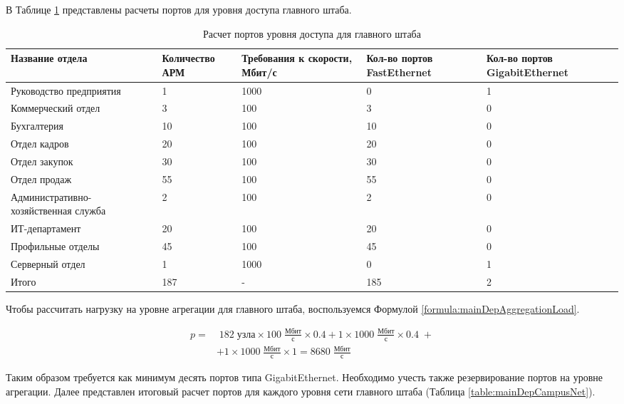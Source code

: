 \documentclass[14pt, a4paper]{extarticle}
\numberwithin{equation}{section}
\begin{document}
В Таблице \ref{table:mainDepAccessLevel} представлены расчеты портов для уровня доступа 
главного штаба.

\begin{table}[H]
\centering
\small
\caption{Расчет портов уровня доступа для главного штаба}
\label{table:mainDepAccessLevel}
\begin{tabular}{|m{4cm}|m{2.5cm}|m{2.5cm}|m{2.5cm}|m{3cm}|}
\hline
\textbf{Название отдела} & \textbf{Количество АРМ} & \textbf{Требования к скорости, Мбит/с} & \textbf{Кол-во портов FastEthernet} & \textbf{Кол-во портов GigabitEthernet} \\
\hline
Руководство предприятия & 1 & 1000 & 0 & 1 \\
\hline
Коммерческий отдел & 3 & 100 & 3 & 0 \\
\hline
Бухгалтерия & 10 & 100 & 10 & 0 \\
\hline
Отдел кадров & 20 & 100 & 20 & 0 \\
\hline
Отдел закупок & 30 & 100 & 30 & 0 \\
\hline
Отдел продаж & 55 & 100 & 55 & 0 \\
\hline
Административно-хозяйственная служба & 2 & 100 & 2 & 0 \\
\hline
ИТ-департамент & 20 & 100 & 20 & 0 \\
\hline
Профильные отделы & 45 & 100 & 45 & 0 \\
\hline
Серверный отдел & 1 & 1000 & 0 & 1 \\
\hline
Итого & 187 & - & 185 & 2 \\
\hline 
\end{tabular}
\end{table}

Чтобы рассчитать нагрузку на уровне агрегации для 
главного штаба, воспользуемся Формулой \ref{formula:mainDepAggregationLoad}.

\begin{equation}
\begin{aligned}
p = & \; 182 \; \text{узла} \times 100 \;\frac{\text{Мбит}}{\text{с}} \times 0.4 + 1 \times 1000 \;\frac{\text{Мбит}}{\text{с}} \times 0.4\; + \\
        & + 1 \times 1000\;\frac{\text{Мбит}}{\text{с}} \times 1 = 8680\;\frac{\text{Мбит}}{\text{с}}
\end{aligned}
\label{formula:mainDepAggregationLoad}
\end{equation}
               
Таким образом требуется как минимум десять портов типа GigabitEthernet.
Необходимо учесть также резервирование портов на уровне агрегации.
Далее представлен итоговый расчет портов для каждого уровня сети
главного штаба (Таблица \ref{table:mainDepCampusNet}). 
\end{document}
